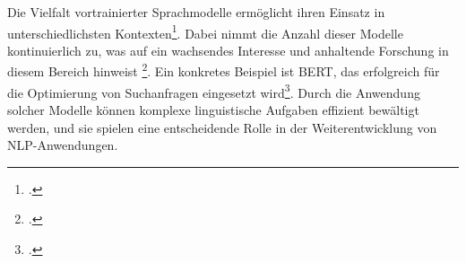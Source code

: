 Die Vielfalt vortrainierter Sprachmodelle ermöglicht ihren Einsatz in unterschiedlichsten Kontexten\footcite{zhou2023comprehensive}. Dabei nimmt die Anzahl dieser Modelle kontinuierlich zu, was auf ein wachsendes Interesse und anhaltende Forschung in diesem Bereich hinweist \footcite{naveed2023comprehensive}. Ein konkretes Beispiel ist BERT, das erfolgreich für die Optimierung von Suchanfragen eingesetzt wird\footcite{devlin2018bert}. Durch die Anwendung solcher Modelle können komplexe linguistische Aufgaben effizient bewältigt werden, und sie spielen eine entscheidende Rolle in der Weiterentwicklung von NLP-Anwendungen. %

